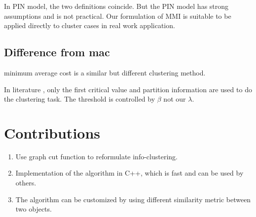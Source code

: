 \documentclass{article}
\begin{document}
In PIN model, the two definitions coincide. But the PIN model has strong assumptions and is not practical. Our formulation of MMI is suitable to be applied directly to cluster cases in real work application.
\subsection{Difference from mac}
minimum average cost is a similar but different clustering method.

In literature \cite{mac}, only the first critical value and partition information are used to do the clustering task. The threshold is controlled by $\beta$ not our $\lambda$.
\section{Contributions}
\begin{enumerate}
\item Use graph cut function to reformulate info-clustering.
\item Implementation of the algorithm in C++, which is fast and can be used by others.
\item The algorithm can be customized by using different similarity metric between two objects.
\end{enumerate}
\appendix
\end{document}
